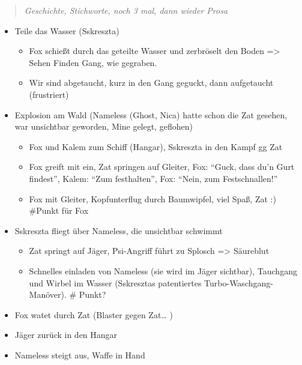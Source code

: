 \documentclass[11pt]{scrartcl}
\begin{document}
\begin{quote}
\emph{Geschichte, Stichworte, noch 3 mal, dann wieder Prosa}

\end{quote}
\begin{itemize}
\item
  Teile das Wasser (Sskreszta)

  \begin{itemize}
  \item
    Fox schießt durch das geteilte Wasser und zerbröselt den Boden
    =\textgreater{} Sehen Finden Gang, wie gegraben.
  \item
    Wir sind abgetaucht, kurz in den Gang geguckt, dann aufgetaucht
    (frustriert)
  \end{itemize}
\item
  Explosion am Wald (Nameless (Ghost, Nica) hatte schon die Zat gesehen,
  war unsichtbar geworden, Mine gelegt, geflohen)

  \begin{itemize}
  \item
    Fox und Kalem zum Schiff (Hangar), Sskreszta in den Kampf gg Zat
  \item
    Fox greift mit ein, Zat springen auf Gleiter, Fox: ``Guck, dass du'n
    Gurt findest'', Kalem: ``Zum festhalten'', Fox: ``Nein, zum
    Festschnallen!''
  \item
    Fox mit Gleiter, Kopfunterflug durch Baumwipfel, viel Spaß, Zat :)
    \#Punkt für Fox
  \end{itemize}
\item
  Sskreszta fliegt über Nameless, die unsichtbar schwimmt

  \begin{itemize}
  \item
    Zat springt auf Jäger, Psi-Angriff führt zu Splosch =\textgreater{}
    Säureblut
  \item
    Schnelles einladen von Nameless (sie wird im Jäger sichtbar),
    Tauchgang und Wirbel im Wasser (Sskresztas patentiertes
    Turbo-Waschgang-Manöver). \# Punkt?
  \end{itemize}
\item
  Fox watet durch Zat (Blaster gegen Zat\ldots{} )
\item
  Jäger zurück in den Hangar
\item
  Nameless steigt aus, Waffe in Hand


\end{itemize}
\end{document}
